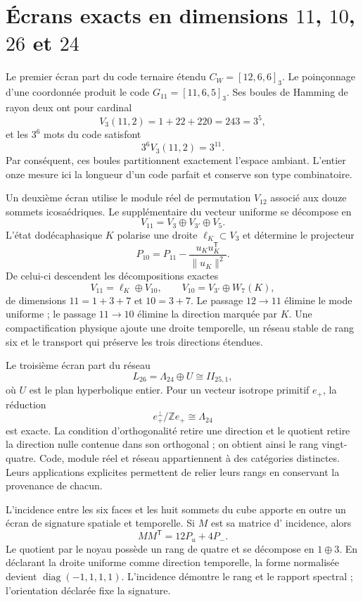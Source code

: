 \section{Écrans exacts en dimensions \(11\), \(10\), \(26\) et \(24\)}

Le premier écran part du code ternaire étendu
\(C_W=[12,6,6]_3\). Le poinçonnage d'une coordonnée produit le code
\(G_{11}=[11,6,5]_3\). Ses boules de Hamming de rayon deux ont pour cardinal
\[
 V_3(11,2)=1+22+220=243=3^5,
\]
et les \(3^6\) mots du code satisfont
\[
 3^6V_3(11,2)=3^{11}.
\]
Par conséquent, ces boules partitionnent exactement l'espace ambiant. L'entier
onze mesure ici la longueur d'un code parfait et conserve son type
combinatoire.

Un deuxième écran utilise le module réel de permutation \(V_{12}\) associé aux
douze sommets icosaédriques. Le supplémentaire du vecteur uniforme se
décompose en
\[
 V_{11}=V_3\oplus V_{3'}\oplus V_5.
\]
L'état dodécaphasique \(K\) polarise une droite \(\ell_K\subset V_3\) et
détermine le projecteur
\[
 P_{10}=P_{11}-\frac{u_Ku_K^{\mathsf T}}{\lVert u_K\rVert^2}.
\]
De celui-ci descendent les décompositions exactes
\[
 V_{11}=\ell_K\oplus V_{10},\qquad
 V_{10}=V_{3'}\oplus W_7(K),
\]
de dimensions \(11=1+3+7\) et \(10=3+7\). Le passage
\(12\to11\) élimine le mode uniforme ; le passage \(11\to10\) élimine la
direction marquée par \(K\). Une compactification physique ajoute une droite
temporelle, un réseau stable de rang six et le transport qui préserve les
trois directions étendues.

Le troisième écran part du réseau
\[
 L_{26}=\Lambda_{24}\oplus U\cong II_{25,1},
\]
où \(U\) est le plan hyperbolique entier. Pour un vecteur isotrope
primitif \(e_+\), la réduction
\[
 e_+^\perp/\mathbb Ze_+\cong\Lambda_{24}
\]
est exacte. La condition d'orthogonalité retire une direction et le quotient
retire la direction nulle contenue dans son orthogonal ; on obtient ainsi le rang
vingt-quatre. Code, module réel et réseau appartiennent à des catégories
distinctes. Leurs applications explicites permettent de relier leurs rangs en conservant la
provenance de chacun.

L'incidence entre les six faces et les huit sommets du cube apporte en outre
un écran de signature spatiale et temporelle. Si \(M\) est sa matrice d'
incidence, alors
\[
 MM^{\mathsf T}=12P_u+4P_-.
\]
Le quotient par le noyau possède un rang de quatre et se décompose en
\(1\oplus3\). En déclarant la droite uniforme comme direction temporelle, la forme
normalisée devient \(\operatorname{diag}(-1,1,1,1)\). L'incidence démontre
le rang et le rapport spectral ; l'orientation déclarée fixe la signature.

